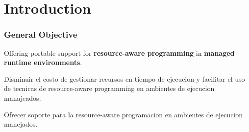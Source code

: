 

\chapter{Introduction}





\begin{comment}
pepe
\end{comment}



\subsection{General Objective}
Offering portable support for \textbf{resource-aware programming} in \textbf{managed runtime environments}.

Disminuir el costo de gestionar recursos en tiempo de ejecucion y facilitar el uso de tecnicas de resource-aware programming en ambientes de ejecucion manajeados.

Ofrecer soporte para la resource-aware programacion en ambientes de ejecucion manejados. 


